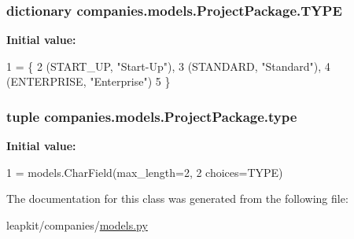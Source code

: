 \hypertarget{classcompanies_1_1models_1_1_project_package_ab94641bdf922977860a1798e9c315838}{
\subsubsection[{T\-Y\-P\-E}]{\setlength{\rightskip}{0pt plus 5cm}dictionary companies.\-models.\-Project\-Package.\-T\-Y\-P\-E\hspace{0.3cm}{\ttfamily [static]}}}\label{classcompanies_1_1models_1_1_project_package_ab94641bdf922977860a1798e9c315838}
{\bfseries Initial value\-:}
\begin{DoxyCode}
1 = \{
2         (START\_UP, \textcolor{stringliteral}{"Start-Up"}),
3         (STANDARD, \textcolor{stringliteral}{"Standard"}),
4         (ENTERPRISE, \textcolor{stringliteral}{"Enterprise"})
5     \}
\end{DoxyCode}
\hypertarget{classcompanies_1_1models_1_1_project_package_a473a942937dd3cd4c5d14d608944c2b6}{
\subsubsection[{type}]{\setlength{\rightskip}{0pt plus 5cm}tuple companies.\-models.\-Project\-Package.\-type\hspace{0.3cm}{\ttfamily [static]}}}\label{classcompanies_1_1models_1_1_project_package_a473a942937dd3cd4c5d14d608944c2b6}
{\bfseries Initial value\-:}
\begin{DoxyCode}
1 = models.CharField(max\_length=2,
2                             choices=TYPE)
\end{DoxyCode}


The documentation for this class was generated from the following file\-:\begin{DoxyCompactItemize}
\item 
leapkit/companies/\hyperlink{companies_2models_8py}{models.\-py}\end{DoxyCompactItemize}
